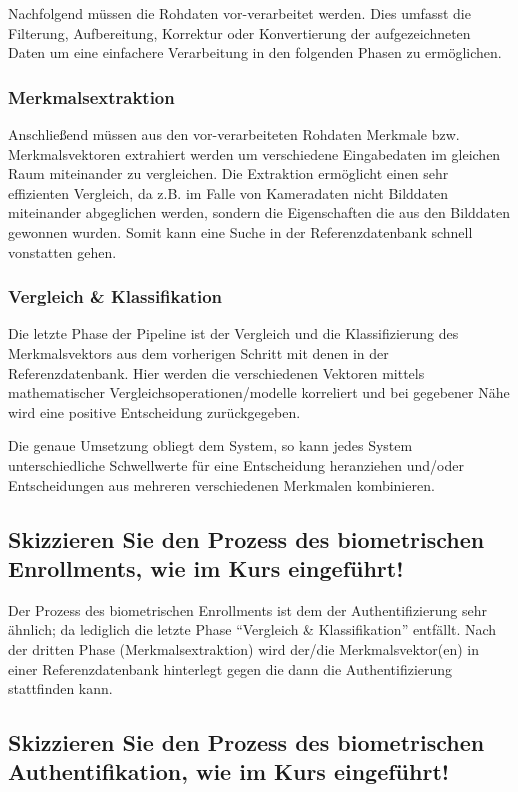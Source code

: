 \documentclass{article}
\begin{document}
Nachfolgend müssen die Rohdaten vor-verarbeitet werden. Dies umfasst die Filterung, Aufbereitung, 
Korrektur oder Konvertierung der aufgezeichneten Daten um eine einfachere Verarbeitung in den folgenden 
Phasen zu ermöglichen.

\subsubsection*{Merkmalsextraktion}

Anschließend müssen aus den vor-verarbeiteten Rohdaten Merkmale bzw. Merkmalsvektoren extrahiert werden um
verschiedene Eingabedaten im gleichen Raum miteinander zu vergleichen. Die Extraktion ermöglicht einen 
sehr effizienten Vergleich, da z.B. im Falle von Kameradaten nicht Bilddaten miteinander abgeglichen 
werden, sondern die Eigenschaften die aus den Bilddaten gewonnen wurden. Somit kann eine Suche in der 
Referenzdatenbank schnell vonstatten gehen.

\subsubsection*{Vergleich \& Klassifikation}

Die letzte Phase der Pipeline ist der Vergleich und die Klassifizierung des Merkmalsvektors aus dem 
vorherigen Schritt mit denen in der Referenzdatenbank. Hier werden die verschiedenen Vektoren mittels 
mathematischer Vergleichsoperationen/modelle korreliert und bei gegebener Nähe wird eine positive 
Entscheidung zurückgegeben.

Die genaue Umsetzung obliegt dem System, so kann jedes System unterschiedliche Schwellwerte für eine 
Entscheidung heranziehen und/oder Entscheidungen aus mehreren verschiedenen Merkmalen kombinieren. 


\subsection{Skizzieren Sie den Prozess des biometrischen Enrollments, wie im Kurs eingeführt!}

Der Prozess des biometrischen Enrollments ist dem der Authentifizierung sehr ähnlich; da lediglich die 
letzte Phase ``Vergleich \& Klassifikation'' entfällt. Nach der dritten Phase (Merkmalsextraktion) wird
der/die Merkmalsvektor(en) in einer Referenzdatenbank hinterlegt gegen die dann die Authentifizierung 
stattfinden kann.


\subsection{Skizzieren Sie den Prozess des biometrischen Authentifikation, wie im Kurs eingeführt!}
\end{document}
